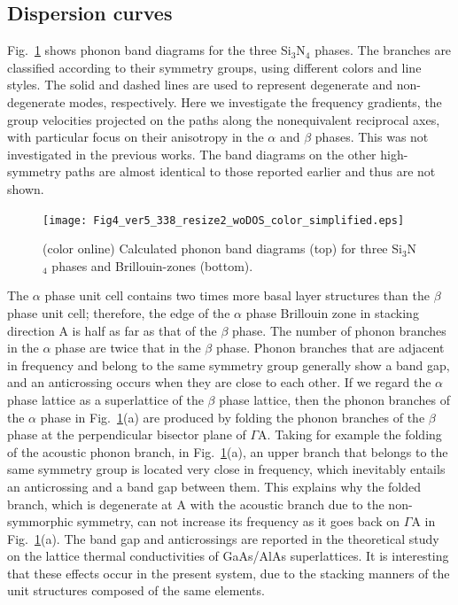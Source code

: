 \documentclass[twocolumn,amsmath,amssymb,a4paper,prb,superscriptaddress,floatfix]{revtex4-1}
\begin{document}
\subsection{Dispersion curves}

Fig.~\ref{fig:Fig4_ver5_338} shows phonon band diagrams for the three
Si$_3$N$_4$ phases. The branches are classified according to their symmetry
groups, using different colors and line styles. The solid and dashed lines are
used to represent degenerate and non-degenerate modes, respectively.  Here we
investigate the frequency gradients, the group velocities projected on the paths
along the nonequivalent reciprocal axes, with particular focus
on their anisotropy in the $\alpha$ and $\beta$ phases. This was not
investigated in the previous works. The band diagrams on the
other high-symmetry paths are almost identical to those reported
earlier\cite{kuwabara,xu} and thus are not shown.

\begin{figure}[ht]
 \begin{center}
  \texttt{[image: Fig4\_ver5\_338\_resize2\_woDOS\_color\_simplified.eps]}
    \caption{(color online) Calculated phonon band
		      diagrams (top) for three Si$_3$N$_4$ phases and Brillouin-zones (bottom).
  \label{fig:Fig4_ver5_338} }
 \end{center}
\end{figure}

The $\alpha$ phase unit cell contains two times more basal layer
structures than the $\beta$ phase unit cell; therefore, the edge of the $\alpha$ phase
Brillouin zone in stacking direction A is half as far as that of the $\beta$
phase. The number of phonon branches in the $\alpha$ phase are twice 
that in the $\beta$ phase. Phonon branches that are adjacent in
frequency and belong to the same symmetry group generally show a band gap, and an
anticrossing occurs when they are close to each other. If we regard the $\alpha$ phase
lattice as a superlattice of the $\beta$ phase lattice, then the phonon branches
of the $\alpha$ phase in Fig.~\ref{fig:Fig4_ver5_338}(a) are produced by folding
the phonon branches of the $\beta$ phase at the perpendicular bisector plane of
$\Gamma$A. Taking for example the folding of the acoustic phonon branch, in
Fig.~\ref{fig:Fig4_ver5_338}(a), an upper branch that belongs to the same symmetry
group is located very close in frequency, which inevitably entails an anticrossing
and a band gap between them. This explains why the folded branch, which is
degenerate at A with the acoustic branch due to the non-symmorphic symmetry, can
not increase its frequency as it goes back on $\Gamma$A in
Fig.~\ref{fig:Fig4_ver5_338}(a). The band gap and anticrossings  are
reported in the theoretical study on the lattice thermal conductivities of GaAs/AlAs
superlattices.\cite{GaAs/AlAs} It is interesting that these effects occur in the
present system, due to the stacking manners of the unit structures composed of
the same elements.
\end{document}
